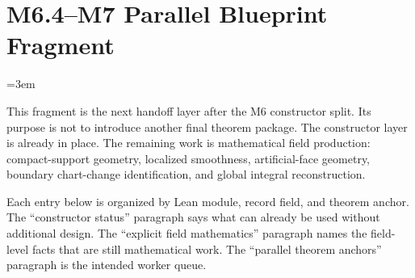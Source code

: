 \section{M6.4--M7 Parallel Blueprint Fragment}
\label{sec:m6_4_m7_parallel_blueprint_fragment}
\begingroup
\sloppy
\emergencystretch=3em

This fragment is the next handoff layer after the M6 constructor split.  Its
purpose is not to introduce another final theorem package.  The constructor
layer is already in place.  The remaining work is mathematical field
production: compact-support geometry, localized smoothness, artificial-face
geometry, boundary chart-change identification, and global integral
reconstruction.

Each entry below is organized by Lean module, record field, and theorem anchor.
The ``constructor status'' paragraph says what can already be used without
additional design.  The ``explicit field mathematics'' paragraph names the
field-level facts that are still mathematical work.  The ``parallel theorem
anchors'' paragraph is the intended worker queue.

